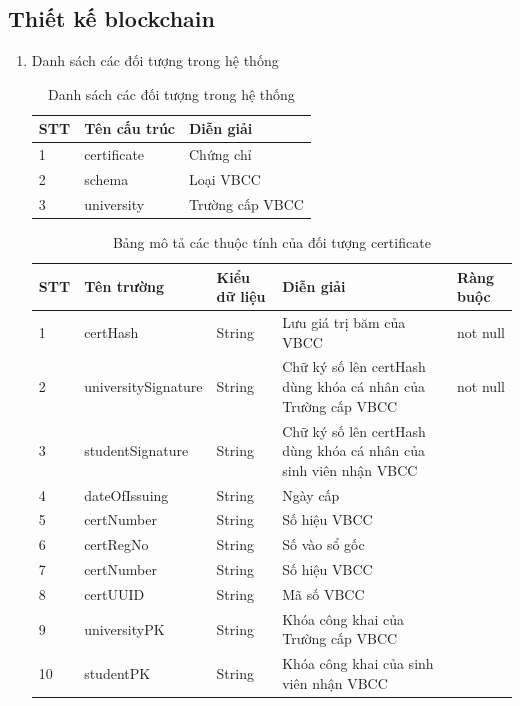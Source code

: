 \subsection{Thiết kế blockchain}
\begin{enumerate}
\item 
Danh sách các đối tượng trong hệ thống

\begin{table}[H]
\caption{Danh sách các đối tượng trong hệ thống}
	\label{table:asset}
	\begin{tabularx} {\textwidth} {|p{1cm}|p{3cm}|X|}
\hline
		STT &	Tên cấu trúc &  Diễn giải \\ \hline
		1 & certificate	& Chứng chỉ  \\ \hline
		2 & schema  &  Loại VBCC  \\ \hline
		3 & university	&  Trường cấp VBCC  \\ \hline
\end{tabularx}
\end{table}

\begin{table}[H]
\caption{Bảng mô tả các thuộc tính của đối tượng certificate}
	\label{table:assetcertificate}
	\begin{tabularx} {\textwidth} {|p{0.8cm}|p{3.5cm}|p{2.5cm}|X|p{2cm}|}
\hline
		STT &	Tên trường & Kiểu dữ liệu & Diễn giải & Ràng buộc \\ \hline
		1 & certHash	& String & Lưu giá trị băm của VBCC  & not null \\ \hline
		2 & universitySignature & String  & Chữ ký số lên certHash dùng khóa cá nhân của Trường cấp VBCC  & not null \\ \hline
		3 & studentSignature	&  String & Chữ ký số lên certHash dùng khóa cá nhân của sinh viên nhận VBCC  & \\ \hline
		4 & dateOfIssuing	& String & Ngày cấp  & \\ \hline
		5 & certNumber	& String & Số hiệu VBCC  & \\ \hline
		6 & certRegNo	& String & Số vào sổ gốc  & \\ \hline
		7 & certNumber	& String & Số hiệu VBCC  & \\ \hline
		8 & certUUID	& String & Mã số VBCC  & \\ \hline
		9 & universityPK	& String & Khóa công khai của Trường cấp VBCC  & \\ \hline
		10 & studentPK	& String & Khóa công khai của sinh viên nhận VBCC  & \\ \hline
\end{tabularx}
\end{table}



\end{enumerate}

